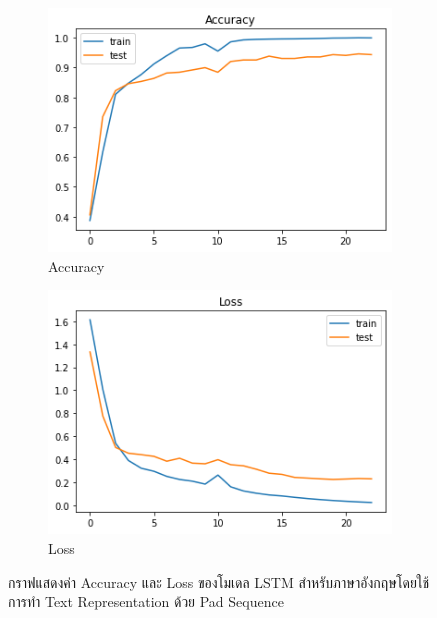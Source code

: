 \documentclass[12pt,oneside,openright,a4paper]{cpe-thai-project}
\begin{document}
      \begin{figure}[!ht]\centering
        \begin{subfigure}{0.49\textwidth}
          \includegraphics[width=\linewidth]{./img/lstm_eng_acc.png} 
          \caption{Accuracy}
          \label{fig:lstm_eng_acc}
        \end{subfigure}
        \begin{subfigure}{0.49\textwidth}
          \includegraphics[width=\linewidth]{./img/lstm_eng_loss.png}
          \caption{Loss}
          \label{fig:lstm_eng_loss}
        \end{subfigure}
        \caption{กราฟแสดงค่า Accuracy และ Loss ของโมเดล LSTM สำหรับภาษาอังกฤษโดยใช้การทำ Text Representation ด้วย Pad Sequence}
        \label{fig:lstm_eng}
      \end{figure}
\end{document}

